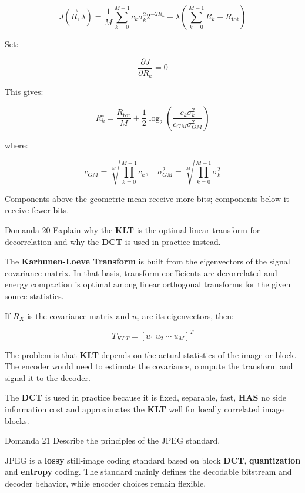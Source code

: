 $$
J(\vec{R},\lambda)=
\frac{1}{M}\sum_{k=0}^{M-1} c_k\sigma_k^2 2^{-2R_k}
+\lambda\left(\sum_{k=0}^{M-1}R_k-R_{\text{tot}}\right)
$$


Set:


$$
\frac{\partial J}{\partial R_k}=0
$$


This gives:


$$
R_k^\star = \frac{R_{\text{tot}}}{M}
+\frac{1}{2}\log_2\left(
\frac{c_k\sigma_k^2}{c_{GM}\sigma_{GM}^2}
\right)
$$


where:


$$
c_{GM}=\sqrt[M]{\prod_{k=0}^{M-1} c_k},
\quad
\sigma_{GM}^2=\sqrt[M]{\prod_{k=0}^{M-1}\sigma_k^2}
$$


Components above the geometric mean receive more bits; components below it receive fewer bits.



\begin{questionbox}{Domanda 20}
Explain why the \textbf{KLT} is the optimal linear transform for decorrelation and why the \textbf{DCT} is used in practice instead.
\end{questionbox}


The \textbf{Karhunen-Loeve Transform} is built from the eigenvectors of the signal covariance matrix. In that basis, transform coefficients are decorrelated and energy compaction is optimal among linear orthogonal transforms for the given source statistics.

If $R_X$ is the covariance matrix and $u_i$ are its eigenvectors, then:


$$
T_{KLT} = [u_1\ u_2\ \cdots\ u_M]^T
$$


The problem is that \textbf{KLT} depends on the actual statistics of the image or block. The encoder would need to estimate the covariance, compute the transform and signal it to the decoder.

The \textbf{DCT} is used in practice because it is fixed, separable, fast, \textbf{HAS} no side information cost and approximates the \textbf{KLT} well for locally correlated image blocks.



\begin{questionbox}{Domanda 21}
Describe the principles of the JPEG standard.
\end{questionbox}


JPEG is a \textbf{lossy} still-image coding standard based on block \textbf{DCT}, \textbf{quantization} and \textbf{entropy} coding. The standard mainly defines the decodable bitstream and decoder behavior, while encoder choices remain flexible.

